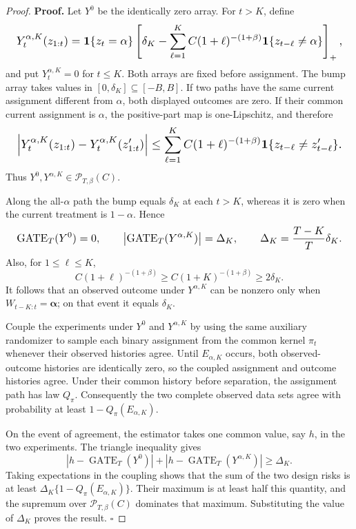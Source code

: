 \documentclass{article}
\begin{document}
\begin{proof}
\textbf{Proof.} Let \(Y^0\) be the identically zero array. For \(t>K\), define
\[
\makebox[\linewidth][c]{\resizebox{0.98\linewidth}{!}{\(\displaystyle Y_t^{\alpha,K}(z_{1:t})
=
\mathbf1\{z_t=\alpha\}
\left[
\delta_K-
\sum_{\ell=1}^K C(1+\ell)^{-(1+\beta)}
\mathbf1\{z_{t-\ell}\ne\alpha\}
\right]_+,\)}}
\]
and put \(Y_t^{\alpha,K}=0\) for \(t\le K\). Both arrays are fixed before assignment. The bump array takes values in \([0,\delta_K]\subseteq[-B,B]\). If two paths have the same current assignment different from \(\alpha\), both displayed outcomes are zero. If their common current assignment is \(\alpha\), the positive-part map is one-Lipschitz, and therefore
\[
\makebox[\linewidth][c]{\resizebox{0.98\linewidth}{!}{\(\displaystyle \left|Y_t^{\alpha,K}(z_{1:t})-Y_t^{\alpha,K}(z'_{1:t})\right|
\le
\sum_{\ell=1}^K C(1+\ell)^{-(1+\beta)}
\mathbf1\{z_{t-\ell}\ne z'_{t-\ell}\}.\)}}
\]
Thus \(Y^0,Y^{\alpha,K}\in\mathcal P_{T,\beta}(C)\).

Along the all-\(\alpha\) path the bump equals \(\delta_K\) at each \(t>K\), whereas it is zero when the current treatment is \(1-\alpha\). Hence
\[
\makebox[\linewidth][c]{\resizebox{0.98\linewidth}{!}{\(\displaystyle \operatorname{GATE}_T(Y^0)=0,
\qquad
\left|\operatorname{GATE}_T(Y^{\alpha,K})\right|
=\Delta_K,
\qquad
\Delta_K=\frac{T-K}{T}\delta_K.\)}}
\]
Also, for \(1\le\ell\le K\),
\[
C(1+\ell)^{-(1+\beta)}
\ge C(1+K)^{-(1+\beta)}
\ge2\delta_K.
\]
It follows that an observed outcome under \(Y^{\alpha,K}\) can be nonzero only when \(W_{t-K:t}=\boldsymbol\alpha\); on that event it equals \(\delta_K\).

Couple the experiments under \(Y^0\) and \(Y^{\alpha,K}\) by using the same auxiliary randomizer to sample each binary assignment from the common kernel \(\pi_t\) whenever their observed histories agree. Until \(E_{\alpha,K}\) occurs, both observed-outcome histories are identically zero, so the coupled assignment and outcome histories agree. Under their common history before separation, the assignment path has law \(Q_\pi\). Consequently the two complete observed data sets agree with probability at least \(1-Q_\pi(E_{\alpha,K})\).

On the event of agreement, the estimator takes one common value, say \(h\), in the two experiments. The triangle inequality gives
\[
|h-\operatorname{GATE}_T(Y^0)|
+
|h-\operatorname{GATE}_T(Y^{\alpha,K})|
\ge\Delta_K.
\]
Taking expectations in the coupling shows that the sum of the two design risks is at least \(\Delta_K\{1-Q_\pi(E_{\alpha,K})\}\). Their maximum is at least half this quantity, and the supremum over \(\mathcal P_{T,\beta}(C)\) dominates that maximum. Substituting the value of \(\Delta_K\) proves the result. \(\square\)
\end{proof}
\end{document}
